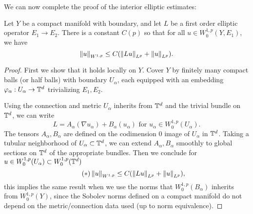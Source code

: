 \documentclass{amsart}
\begin{document}
We can now complete the proof of the interior elliptic estimates:
\begin{thm}
  Let $Y$ be a compact manifold with boundary, and let $L$ be a first
  order elliptic operator $E_{1}\to E_{2}$. There is a constant $C(p)$
  so that for all $u\in
  W^{1,p}_{0}(Y,E_{1})$, we have
  \begin{equation*}
    \left\lVert u\right\rVert_{W^{1,p}}\le C(\left\lVert Lu\right\rVert_{L^{p}}+\left\lVert u\right\rVert_{L^{p}}).
  \end{equation*}
\end{thm}
\begin{proof}
  First we show that it holds locally on $Y$. Cover $Y$ by finitely many compact
  balls (or half balls) with boundary $U_{\alpha}$, each equipped with an embedding
  $\varphi_{\alpha}:U_{\alpha}\to \mathbb{T}^{d}$ trivializing $E_{1},E_{2}$.

  Using the connection and metric $U_{\alpha}$ inherits from
  $\mathbb{T}^{d}$ and the trivial bundle on $\mathbb{T}^{d}$, we can write
  \begin{equation*}
    L=A_{\alpha}(\nabla u_{\alpha})+B_{\alpha}(u_{\alpha})\text{ for
      $u_{\alpha}\in W^{1,p}_{0}(U_{\alpha})$.}
  \end{equation*}
  The tensors $A_{\alpha},B_{\alpha}$ are defined on the codimension
  $0$ image of $U_{\alpha}$ in $\mathbb{T}^{d}$. Taking a tubular
  neighborhood of $U_{\alpha}\subset \mathbb{T}^{d}$, we can extend
  $A_{\alpha},B_{\alpha}$ smoothly to global sections on $\mathbb{T}^{d}$ of the appropriate
  bundles. Then we conclude for $u\in W^{1,p}_{0}(U_{\alpha})\subset W^{1,p}_{0}(\mathbb{T}^{d})$ 
  \begin{equation*}\tag{$\ast$}
    \left\lVert u\right\rVert_{W^{1,p}}\le C(\left\lVert Lu\right\rVert_{L^{p}}+\left\lVert u\right\rVert_{L^{p}}),
  \end{equation*}
  this implies the same result when we use the norms that
  $W^{1,p}_{0}(B_{\alpha})$ inherits from $W^{1,p}_{0}(Y)$, since the
  Sobolev norms defined on a compact manifold do not depend on the
  metric/connection data used (up to norm equivalence).


\end{proof}
\end{document}

